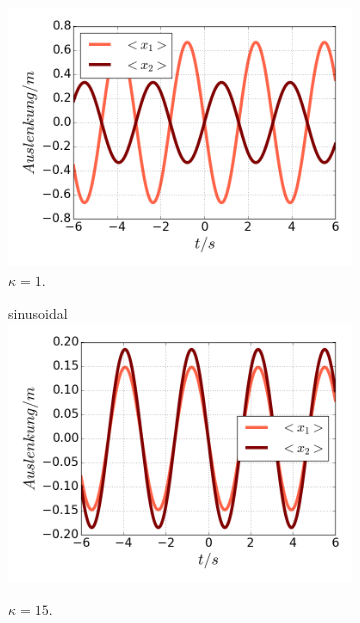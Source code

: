 \begin{figure}
\begin{subfigure}[t]{0.5\textwidth}
        \centering
        \includegraphics[width=\textwidth]{plots/<x12>nlschwach.png}
        \caption{$\kappa=1$.}
        \label{fig:schwach}
      \end{subfigure}
      \begin{subfigure}[t]{0.5\textwidth}sinusoidal
          \centering
          \includegraphics[width=\textwidth]{plots/<x12>nlstark.png}
          \caption{$\kappa=15$.}
          \label{fig:stark}
      \end{subfigure}
      \begin{subfigure}[t]{0.5\textwidth}
        \centering

\end{subfigure}
\end{figure}
